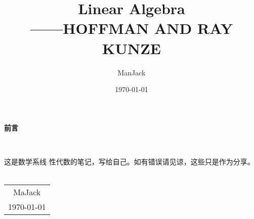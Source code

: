 \documentclass[11pt, a4paper, oneside,UTF8]{ctexbook}
\title{{\Huge{\textbf{Linear Algebra}}}\\------HOFFMAN AND RAY KUNZE}
\author{ManJack}
\date{\today}
\newtheorem[M]{theorem}{Theorem}[section]
\newtheorem[M]{lemma}[theorem]{Lemma}
\newtheorem[M]{proposition}[theorem]{Proposition}
\newtheorem[M]{corollary}[theorem]{Corollary}
\newtheorem[M]{definition}{Definition}[section]
\begin{document}
\maketitle

\setcounter{page}{1}
\newpage
\begin{center}
	\Huge\textbf{前言}
\end{center}~\

这是数学系线      性代数的笔记，写给自己。如有错误请见谅，这些只是作为分享。
~
\begin{flushright}
	\begin{tabular}{c}
		MaJack \\
		\today
	\end{tabular}
\end{flushright}

\newpage
{}
\setcounter{page}{1}

\tableofcontents
\newpage
\setcounter{page}{1}




\end{document}
